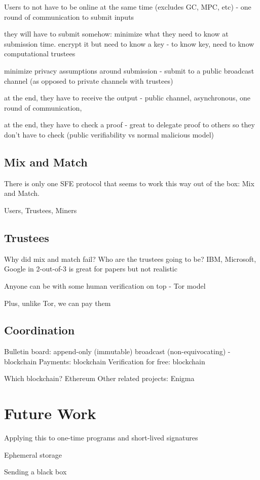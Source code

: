 Users to not have to be online at the same time (excludes GC, MPC, etc) - one round of communication to submit inputs

they will have to submit somehow: minimize what they need to know at submission time. encrypt it but need to know a key - to know key, need to know computational trustees

minimize privacy assumptions around submission - submit to a public broadcast channel (as opposed to private channels with trustees) 

at the end, they have to receive the output - public channel, asynchronous, one round of communication, 

at the end, they have to check a proof - great to delegate proof to others so they don't have to check (public verifiability vs normal malicious model)

\subsection{Mix and Match}

There is only one SFE protocol that seems to work this way out of the box: Mix and Match.

Users, Trustees, Miners

\subsection{Trustees}

Why did mix and match fail? Who are the trustees going to be? IBM, Microsoft, Google in 2-out-of-3 is great for papers but not realistic 

Anyone can be with some human verification on top - Tor model 

Plus, unlike Tor, we can pay them

\subsection{Coordination}

Bulletin board: append-only (immutable) broadcast (non-equivocating) - blockchain
Payments: blockchain
Verification for free: blockchain

Which blockchain? Ethereum
Other related projects: Enigma

\section{Future Work}

Applying this to one-time programs and short-lived signatures

Ephemeral storage

Sending a black box

 

